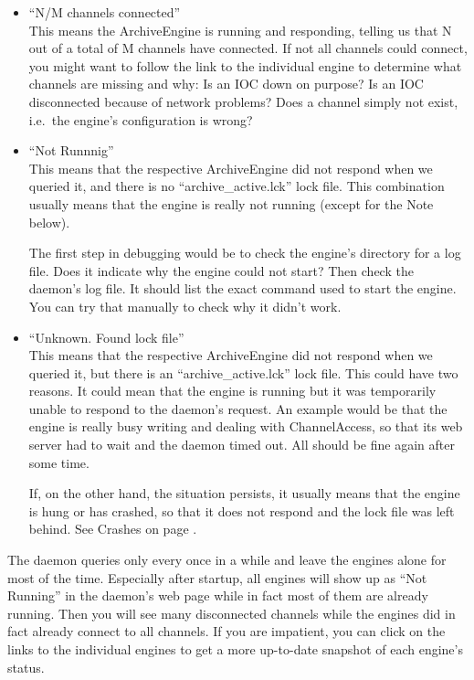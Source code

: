 \begin{itemize}
\item ``N/M channels connected''\\
      This means the ArchiveEngine is running and responding,
      telling us that N out of a total of M channels have connected.
      If not all channels could connect, you might want to follow
      the link to the individual engine to determine what channels are
      missing and why: Is an IOC down on purpose? Is an IOC
      disconnected because of network problems? Does a channel simply
      not exist, i.e.\ the engine's configuration is wrong?
\item ``Not Runnnig''\\
      This means that the respective ArchiveEngine did not respond
      when we queried it, and there is no ``archive\_active.lck'' lock
      file. This combination usually means that the engine is really
      not running (except for the Note below).

      The first step in debugging would be to check the engine's
      directory for a log file. Does it indicate why the engine could
      not start? Then check the daemon's log file. It should list the
      exact command used to start the engine. You can try that
      manually to check why it didn't work.
\item ``Unknown. Found lock file''\\
      This means that the respective ArchiveEngine did not respond
      when we queried it, but there is an ``archive\_active.lck'' lock
      file. This could have two reasons. It could mean that the engine
      is running but it was temporarily unable to respond to the
      daemon's request. An example would be that the engine is really
      busy writing and dealing with ChannelAccess, so that its web
      server had to wait and the daemon timed out. All should be fine
      again after some time.

      If, on the other hand, the situation persists, it usually means
      that the engine is hung or has crashed, so that it does not
      respond and the lock file was left behind.
      See Crashes on page \pageref{sec:crash}.
\end{itemize}

\NOTE The daemon queries only every once in a while and leave the
engines alone for most of the time.
Especially after startup, all engines will show up as ``Not Running''
in the daemon's web page while in fact most of them are already
running. Then you will see many disconnected channels while the
engines did in fact already connect to all channels. 
If you are impatient, you can click on the links to the individual
engines to get a more up-to-date snapshot of each engine's status.

